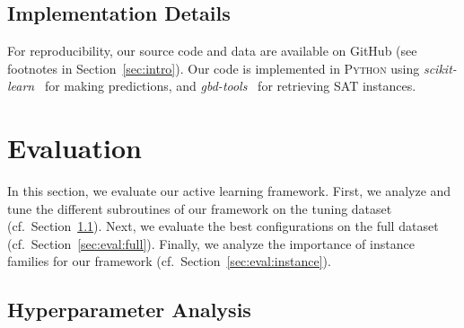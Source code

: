 \documentclass[sn-basic, Numbered]{sn-jnl} %
\begin{document}
\subsection{Implementation Details}
\label{sec:exdesign:impl}

For reproducibility, our source code and data are available on GitHub (see footnotes in Section~\ref{sec:intro}).
Our code is implemented in \textsc{Python} using \emph{scikit-learn}~\cite{scikit-learn} for making predictions, and \emph{gbd-tools}~\cite{IserS18} for retrieving SAT instances.


\section{Evaluation}
\label{sec:eval}

In this section, we evaluate our active learning framework.
First, we analyze and tune the different subroutines of our framework on the tuning dataset (cf.~Section~\ref{sec:eval:hyper}).
Next, we evaluate the best configurations on the full dataset (cf.~Section~\ref{sec:eval:full}).
Finally, we analyze the importance of instance families for our framework (cf.~Section~\ref{sec:eval:instance}).

\subsection{Hyperparameter Analysis}
\label{sec:eval:hyper}
\end{document}
